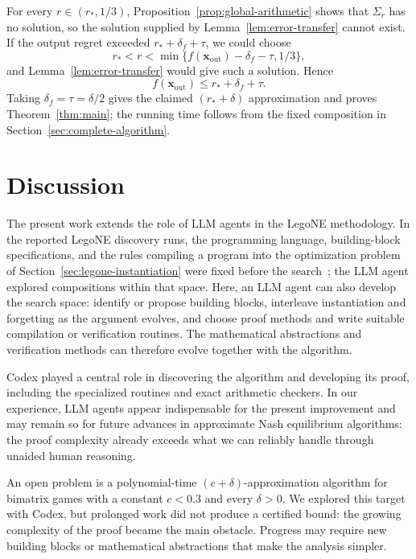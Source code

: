 \documentclass[11pt]{article}
\theoremstyle{remark}
\theoremstyle{plain}
\begin{document}
For every $r\in(r_*,1/3)$, Proposition~\ref{prop:global-arithmetic}
shows that $\Sigma_r$ has no solution, so the solution supplied by
Lemma~\ref{lem:error-transfer} cannot exist.
If the output regret exceeded $r_*+\delta_f+\tau$, we could choose
\[
 r_*<r<\min\{f(\boldsymbol x_{\mathrm{out}})-\delta_f-\tau,1/3\},
\]
and Lemma~\ref{lem:error-transfer} would give such a solution. Hence
\begin{equation}
 f(\boldsymbol x_{\mathrm{out}})\le r_*+\delta_f+\tau.
 \label{eq:main-error-final-bound}
\end{equation}
Taking $\delta_f=\tau=\delta/2$ gives the claimed
$(r_*+\delta)$ approximation and proves Theorem~\ref{thm:main};
the running time follows from the fixed composition in
Section~\ref{sec:complete-algorithm}.

\section{Discussion}
\label{sec:discussion}

The present work extends the role of LLM agents in the LegoNE
methodology. In the reported LegoNE discovery runs, the programming
language, building-block specifications, and the rules compiling a
program into the optimization problem of
Section~\ref{sec:legone-instantiation} were
fixed before the search~\cite{legone2026,computeraided2026}; the LLM
agent explored compositions within that space. Here, an LLM agent
can also develop the search space: identify or propose building
blocks, interleave instantiation and forgetting as the argument
evolves, and choose proof methods and write suitable compilation
or verification routines. The mathematical abstractions and
verification methods can therefore evolve together with the algorithm.

Codex played a central role in discovering the algorithm and developing
its proof, including the specialized routines and exact arithmetic
checkers. In our experience, LLM agents appear indispensable for the
present improvement and may remain so for future advances in
approximate Nash equilibrium algorithms: the proof complexity already
exceeds what we can reliably handle through unaided human reasoning.

An open problem is a polynomial-time $(c+\delta)$-approximation
algorithm for bimatrix games with a constant $c<0.3$ and every
$\delta>0$. We explored this target with Codex, but prolonged work
did not produce a certified bound: the growing complexity of the
proof became the main obstacle. Progress may require new building
blocks or mathematical abstractions that make the analysis simpler.
\end{document}
